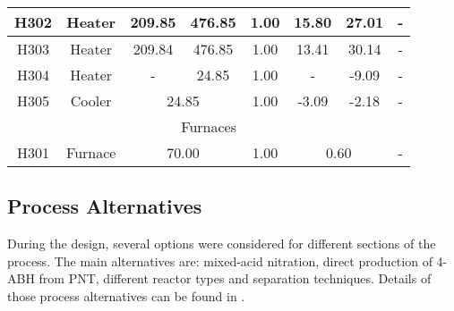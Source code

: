 \begin{table}[h]
{\begin{tabular}{|c|c|c|c|c|c|c|c|c|c|}
H302                  & \multicolumn{2}{c|}{Heater}                         & 209.85            & 476.85            & 1.00                            & 15.80            & 27.01            & \multicolumn{2}{c|}{-}                      \\ \hline
H303                  & \multicolumn{2}{c|}{Heater}                         & 209.84            & 476.85            & 1.00                            & 13.41            & 30.14            & \multicolumn{2}{c|}{-}                      \\ \hline
H304                  & \multicolumn{2}{c|}{Heater}                         & -                 & 24.85             & 1.00                            & -                & -9.09            & \multicolumn{2}{c|}{-}                      \\ \hline
H305                  & \multicolumn{2}{c|}{Cooler}                         & \multicolumn{2}{c|}{24.85}            & 1.00                            & -3.09            & -2.18            & \multicolumn{2}{c|}{-}                      \\ \hline
\multicolumn{10}{|c|}{Furnaces}                                                                                                                                                                                                           \\ \hline
H301                  & \multicolumn{2}{c|}{Furnace}                        & \multicolumn{2}{c|}{70.00}            & 1.00                            & \multicolumn{2}{c|}{0.60}           & \multicolumn{2}{c|}{-}                      \\ \hline
\end{tabular}%
}
\end{table}

\subsection{Process Alternatives}
During the design, several options were considered for different sections of the process. The main alternatives are: mixed-acid  nitration, direct production of 4-ABH from PNT, different reactor types and separation techniques. Details of those process alternatives can be found in .




